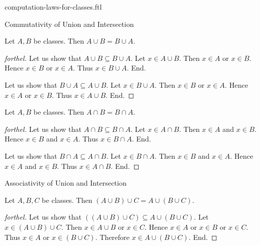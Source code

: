 \documentclass{naproche-library}
\begin{document}
\begin{smodule}[title=Computation Laws For Classes]{computation-laws-for-classes.ftl}

\begin{sfragment}{Commutativity of Union and Intersection}
  \begin{proposition}[forthel,id=FOUNDATIONS_02_8446177632583680]
    Let $A, B$ be classes.
    Then $A \cup B = B \cup A$.
  \end{proposition}
  \begin{proof}[forthel]
    Let us show that $A \cup B \subseteq B \cup A$.
      Let $x \in A \cup B$.
      Then $x \in A$ or $x \in B$.
      Hence $x \in B$ or $x \in A$.
      Thus $x \in B \cup A$.
    End.

    Let us show that $B \cup A \subseteq A \cup B$.
      Let $x \in B \cup A$.
      Then $x \in B$ or $x \in A$.
      Hence $x \in A$ or $x \in B$.
      Thus $x \in A \cup B$.
    End.
  \end{proof}

  \begin{proposition}[forthel,id=FOUNDATIONS_02_7565102251245568]
    Let $A, B$ be classes.
    Then $A \cap B = B \cap A$.
  \end{proposition}
  \begin{proof}[forthel]
    Let us show that $A \cap B \subseteq B \cap A$.
      Let $x \in A \cap B$.
      Then $x \in A$ and $x \in B$.
      Hence $x \in B$ and $x \in A$.
      Thus $x \in B \cap A$.
    End.

    Let us show that $B \cap A \subseteq A \cap B$.
      Let $x \in B \cap A$.
      Then $x \in B$ and $x \in A$.
      Hence $x \in A$ and $x \in B$.
      Thus $x \in A \cap B$.
    End.
  \end{proof}
\end{sfragment}

\begin{sfragment}{Associativity of Union and Intersection}
  \begin{proposition}[forthel,id=FOUNDATIONS_02_3854032263184384]
    Let $A, B, C$ be classes.
    Then $(A \cup B) \cup C = A \cup (B \cup C)$.
  \end{proposition}
  \begin{proof}[forthel]
    Let us show that $((A \cup B) \cup C) \subseteq A \cup (B \cup C)$. %
      Let $x \in (A \cup B) \cup C$.
      Then $x \in A \cup B$ or $x \in C$.
      Hence $x \in A$ or $x \in B$ or $x \in C$.
      Thus $x \in A$ or $x \in (B \cup C)$.
      Therefore $x \in A \cup (B \cup C)$.
    End.


\end{proof}
\end{sfragment}
\end{smodule}
\end{document}
